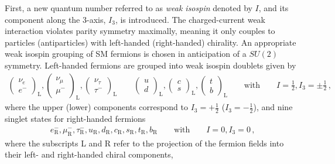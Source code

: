 First, a new quantum number referred to as \emph{weak isospin} denoted by $I$,
and its component along the 3-axis, $I_3$, is introduced. The charged-current
weak interaction violates parity symmetry maximally, meaning it only couples to
particles (antiparticles) with left-handed (right-handed) chirality. An
appropriate weak isospin grouping of SM fermions is chosen in anticipation of a
$SU(2)$ symmetry.
Left-handed fermions are grouped into weak isospin doublets given by
\begin{align*}
  \begin{pmatrix}
    \nu_{e} \\
    e^{-}
  \end{pmatrix}_{\text{L}},
  \begin{pmatrix}
    \nu_{\mu} \\
    \mu^{-}
  \end{pmatrix}_{\text{L}},
  \begin{pmatrix}
    \nu_{\tau} \\
    \tau^{-}
  \end{pmatrix}_{\text{L}}
  \qquad
  \begin{pmatrix}
    u \\
    d
  \end{pmatrix}_{\text{L}},
  \begin{pmatrix}
    c \\
    s
  \end{pmatrix}_{\text{L}},
  \begin{pmatrix}
    t \\
    b
  \end{pmatrix}_{\text{L}}
  \qquad
  \text{with}
  \qquad
  I = \frac{1}{2}, I_3 = \pm \frac{1}{2} \,\text{,}
\end{align*}
where the upper (lower) components correspond to $I_3 = +\frac{1}{2}$
($I_3 = -\frac{1}{2}$), and nine singlet states for right-handed fermions
\begin{align*}
  e^{-}_{\text{R}}, \mu^{-}_{\text{R}}, \tau^{-}_{\text{R}},
  u_{\text{R}}, d_{\text{R}}, c_{\text{R}}, s_{\text{R}}, t_{\text{R}}, b_{\text{R}}
  \qquad
  \text{with}
  \qquad
  I = 0, I_3 = 0 \,\text{,}
\end{align*}
where the subscripts L and R refer to the projection of the fermion fields into
their left- and right-handed chiral components,
